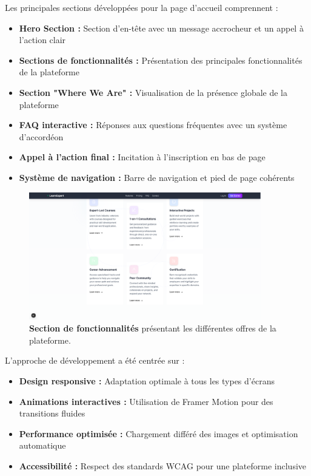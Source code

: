 Les principales sections développées pour la page d'accueil comprennent :
\begin{itemize}
  \item \textbf{Hero Section :} Section d'en-tête avec un message accrocheur et un appel à l'action clair
  \item \textbf{Sections de fonctionnalités :} Présentation des principales fonctionnalités de la plateforme
  \item \textbf{Section "Where We Are" :} Visualisation de la présence globale de la plateforme
  \item \textbf{FAQ interactive :} Réponses aux questions fréquentes avec un système d'accordéon
  \item \textbf{Appel à l'action final :} Incitation à l'inscription en bas de page
  \item \textbf{Système de navigation :} Barre de navigation et pied de page cohérents
\end{itemize}

\begin{figure}[H]
  \centering
  \includegraphics[width=0.9\textwidth,keepaspectratio]{week_2_img/fetchersection_2.png}
  \caption{\textbf{Section de fonctionnalités} présentant les différentes offres de la plateforme.}
  \label{fig:features_section}
\end{figure}

L'approche de développement a été centrée sur :
\begin{itemize}
  \item \textbf{Design responsive :} Adaptation optimale à tous les types d'écrans
  \item \textbf{Animations interactives :} Utilisation de Framer Motion pour des transitions fluides
  \item \textbf{Performance optimisée :} Chargement différé des images et optimisation automatique
  \item \textbf{Accessibilité :} Respect des standards WCAG pour une plateforme inclusive
\end{itemize}

